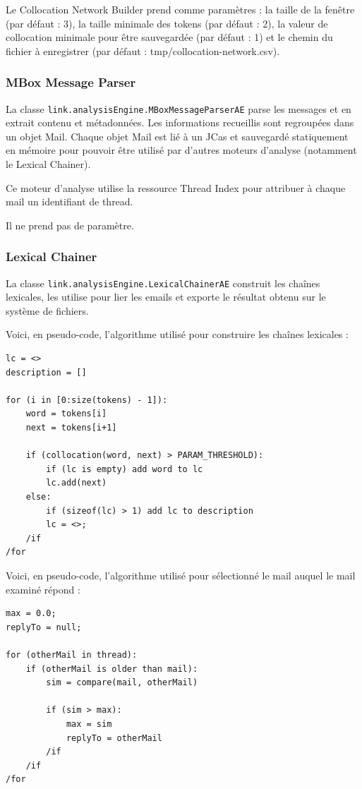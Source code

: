 \documentclass[a4paper]{article}
\begin{document}
Le Collocation Network Builder prend comme paramètres : la taille de la fenêtre (par défaut : 3), la taille minimale des tokens (par défaut : 2), la valeur de collocation minimale pour être sauvegardée (par défaut : 1) et le chemin du fichier à enregistrer (par défaut : tmp/collocation-network.csv).

\subsubsection{MBox Message Parser}

La classe \texttt{link.analysisEngine.MBoxMessageParserAE} parse les messages et en extrait contenu et métadonnées. Les informations recueillis sont regroupées dans un objet Mail. Chaque objet Mail est lié à un JCas et sauvegardé statiquement en mémoire pour pouvoir être utilisé par d'autres moteurs d'analyse (notamment le Lexical Chainer).

Ce moteur d'analyse utilise la ressource Thread Index pour attribuer à chaque mail un identifiant de thread.

Il ne prend pas de paramètre.

\subsubsection{Lexical Chainer}

La classe \texttt{link.analysisEngine.LexicalChainerAE} construit les chaînes lexicales, les utilise pour lier les emails et exporte le résultat obtenu sur le système de fichiers.

Voici, en pseudo-code, l'algorithme utilisé pour construire les chaînes lexicales :
	
\begin{lstlisting}
lc = <>
description = []

for (i in [0:size(tokens) - 1]):
	word = tokens[i]
	next = tokens[i+1]
	
	if (collocation(word, next) > PARAM_THRESHOLD):
		if (lc is empty) add word to lc
		lc.add(next)
	else:
		if (sizeof(lc) > 1) add lc to description
		lc = <>;
	/if
/for
\end{lstlisting}

Voici, en pseudo-code, l'algorithme utilisé pour sélectionné le mail auquel le mail examiné répond :

\begin{lstlisting}
max = 0.0;
replyTo = null;

for (otherMail in thread):
	if (otherMail is older than mail):
		sim = compare(mail, otherMail)
		
		if (sim > max):
			max = sim
			replyTo = otherMail
		/if
	/if
/for
\end{lstlisting}
\end{document}
